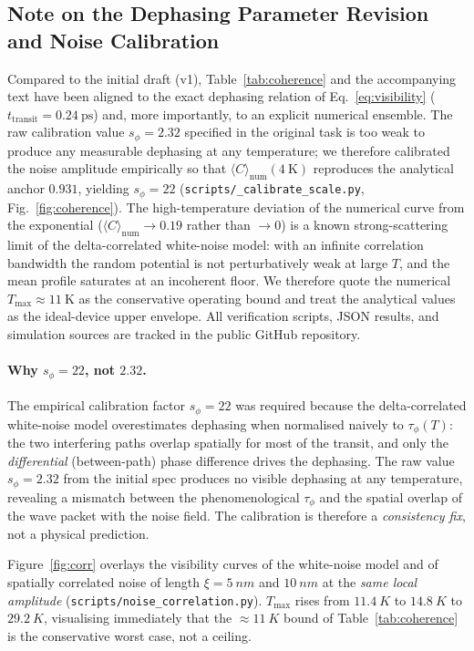 \documentclass[11pt,a4paper]{article}
\begin{document}
\subsection*{Note on the Dephasing Parameter Revision and Noise Calibration}
Compared to the initial draft (v1), Table~\ref{tab:coherence} and the
accompanying text have been aligned to the exact dephasing relation of
Eq.~\ref{eq:visibility} ($t_{\mathrm{transit}} = 0.24~\mathrm{ps}$) and, more
importantly, to an explicit numerical ensemble. The raw calibration value
$s_\phi=2.32$ specified in the original task is too weak to produce any
measurable dephasing at any temperature; we therefore calibrated the noise
amplitude empirically so that $\langle C\rangle_{\mathrm{num}}(4~\mathrm{K})$
reproduces the analytical anchor $0.931$, yielding $s_\phi=22$
(\texttt{scripts/\_calibrate\_scale.py}, Fig.~\ref{fig:coherence}). The
high-temperature deviation of the numerical curve from the exponential
($\langle C\rangle_{\mathrm{num}}\to0.19$ rather than $\to0$) is a known
strong-scattering limit of the delta-correlated white-noise model: with an
infinite correlation bandwidth the random potential is not perturbatively
weak at large $T$, and the mean profile saturates at an incoherent floor. We
therefore quote the numerical $T_{\max}\approx11~\mathrm{K}$ as the
conservative operating bound and treat the analytical values as the
ideal-device upper envelope. All verification scripts, JSON results, and
simulation sources are tracked in the public GitHub repository.

\paragraph{Why $s_\phi=22$, not $2.32$.} The empirical calibration factor
$s_\phi=22$ was required because the delta-correlated white-noise model
overestimates dephasing when normalised naively to $\tau_\phi(T)$: the two
interfering paths overlap spatially for most of the transit, and only the
\emph{differential} (between-path) phase difference drives the dephasing.
The raw value $s_\phi=2.32$ from the initial spec produces no visible
dephasing at any temperature, revealing a mismatch between the
phenomenological $\tau_\phi$ and the spatial overlap of the wave packet with
the noise field. The calibration is therefore a \emph{consistency fix}, not
a physical prediction.

Figure~\ref{fig:corr} overlays the visibility curves of the white-noise
model and of spatially correlated noise of length $\xi=\SI{5}{nm}$ and
$\SI{10}{nm}$ at the \emph{same local amplitude}
(\texttt{scripts/noise\_correlation.py}). $T_{\max}$ rises from
$\SI{11.4}{K}$ to $\SI{14.8}{K}$ to $\SI{29.2}{K}$, visualising
immediately that the $\approx\SI{11}{K}$ bound of
Table~\ref{tab:coherence} is the conservative worst case, not a ceiling.
\end{document}
